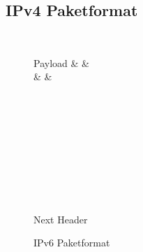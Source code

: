         \subsection{IPv4 Paketformat}
            \begin{figure}[H]
            	\centering
                \begin{bytefield}[bitwidth = 1.2em]{32}
		             \\
		            \begin{rightwordgroup}{Payload}
			             &  &  \\
			             &  &  \\
			             \\
			             \\
			             \\
			             \\
			             \\
			             \\
			             \\
			        \end{rightwordgroup} \\
		            \begin{rightwordgroup}{Next Header}
		            \end{rightwordgroup}
                \end{bytefield}
                \caption{IPv6 Paketformat}
                \label{fig:ipv6packet}
            \end{figure}
            
